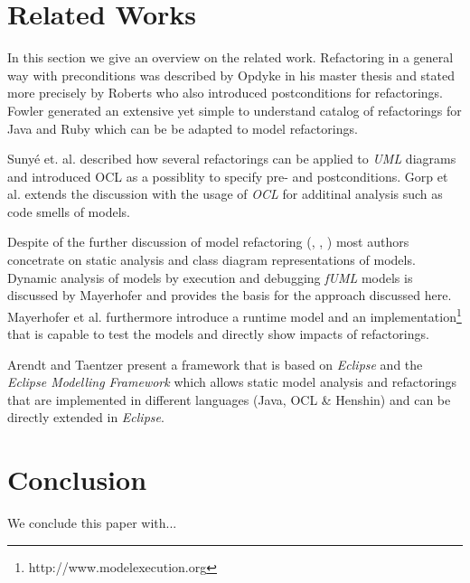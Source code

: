 \documentclass{llncs}
\begin{document}
\section{Related Works}

In this section we give an overview on the related work. Refactoring in a general way with preconditions was described
by Opdyke \cite{mast:REFOOF} in his master thesis and stated more precisely by Roberts \cite{rob99} who also introduced
postconditions for refactorings. Fowler \cite{fow99} generated an extensive yet simple to understand catalog of
refactorings for Java and Ruby which can be be adapted to model refactorings.


Suny{\'e} et. al. \cite{DBLP:conf/uml/SunyePTJ01} described how several refactorings can be applied to \textit{UML}
diagrams and introduced OCL as a possiblity to specify pre- and postconditions. Gorp et al. \cite{gorp03} extends the
discussion with the usage of \textit{OCL} for additinal analysis such as code smells of models.


Despite of the further discussion of model refactoring (\cite{DBLP:conf/uml/CorreaW04}, \cite{DBLP:conf/ershov/BaarM06},
\cite{DBLP:journals/ase/ArendtT13}) most authors concetrate on static analysis and class diagram representations of
models. Dynamic analysis of models by execution and debugging \textit{fUML} models is discussed by Mayerhofer
\cite{DBLP:conf/icse/Mayerhofer12} and provides the basis for the approach discussed here. Mayerhofer et al.
\cite{DBLP:conf/models/MayerhoferLK12} furthermore introduce a runtime model and an
implementation\footnote{http://www.modelexecution.org} that is capable to test the models and directly show impacts of
refactorings.


Arendt and Taentzer \cite{DBLP:journals/ase/ArendtT13} present a framework that is based on \textit{Eclipse} and the
\textit{Eclipse Modelling Framework} which allows static model analysis and refactorings that are implemented in
different languages (Java, OCL \& Henshin) and can be directly extended in \textit{Eclipse}.


\section{Conclusion}
We conclude this paper with...

\newpage


\end{document}
